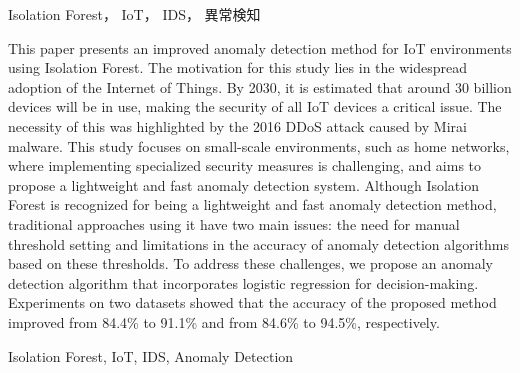 \documentclass{css}
\begin{document}

\begin{jkeyword}
Isolation Forest， IoT， IDS， 異常検知
\end{jkeyword}

\begin{eabstract}
    This paper presents an improved anomaly detection method for IoT environments using Isolation Forest. The motivation for this study lies in the widespread adoption of the Internet of Things. By 2030, it is estimated that around 30 billion devices will be in use, making the security of all IoT devices a critical issue. The necessity of this was highlighted by the 2016 DDoS attack caused by Mirai malware. This study focuses on small-scale environments, such as home networks, where implementing specialized security measures is challenging, and aims to propose a lightweight and fast anomaly detection system. Although Isolation Forest is recognized for being a lightweight and fast anomaly detection method, traditional approaches using it have two main issues: the need for manual threshold setting and limitations in the accuracy of anomaly detection algorithms based on these thresholds. To address these challenges, we propose an anomaly detection algorithm that incorporates logistic regression for decision-making. Experiments on two datasets showed that the accuracy of the proposed method improved from 84.4\% to 91.1\% and from 84.6\% to 94.5\%, respectively.
\end{eabstract}


\begin{ekeyword}
Isolation Forest, IoT, IDS, Anomaly Detection
\end{ekeyword}


\maketitle

\end{document}
